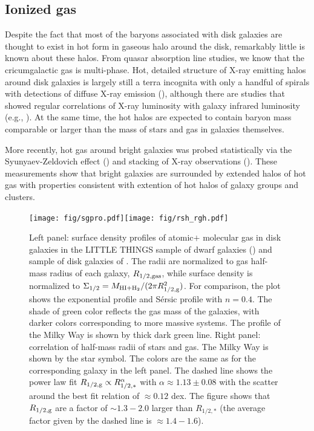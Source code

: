 \subsection{Ionized gas}
Despite the fact that most of the baryons associated with disk galaxies are thought to exist in hot form in gaseous halo around the disk, remarkably little is known about these halos. From quasar absorption line studies, we know that the cricumgalactic gas is multi-phase. Hot, detailed structure of X-ray emitting halos around disk galaxies is largely still a terra incognita with only a handful of spirals with detections of diffuse X-ray emission (\href{http://adsabs.harvard.edu/abs/2013ApJ...772...97B}{\citealt{bogdan_etal13}}), although there are studies that showed regular correlations of X-ray luminosity with galaxy infrared luminosity (e.g., \href{http://arxiv.org/abs/1011.1906}{\citealt{crain_etal10}}). At the same time, the hot halos are expected to contain baryon mass comparable or larger than the mass of stars and gas in galaxies themselves. 

More recently, hot gas around bright galaxies was probed statistically via the Syunyaev-Zeldovich effect (\href{http://adsabs.harvard.edu/abs/2013A%26A...557A..52P}{\citealt{ade_etal13}}) and stacking of X-ray observations (\href{http://adsabs.harvard.edu/abs/2015MNRAS.449.3806A}{\citealt{anderson_etal15}}). These measurements show that bright galaxies are surrounded by extended halos of hot gas with properties consistent with extention of hot halos of galaxy groups and clusters. 

\begin{figure}[t]
\centerline{
\texttt{[image: fig/sgpro.pdf]}\hspace{-2mm}\texttt{[image: fig/rsh\_rgh.pdf]}}
\vspace{-5mm}
\caption{Left panel: surface density profiles of atomic$+$ molecular gas in disk galaxies in the LITTLE THINGS sample of dwarf galaxies (\href{http://adsabs.harvard.edu/abs/2012AJ....143...47Z}{\citealt{zhang_etal12}}) and sample of disk galaxies of \href{http://adsabs.harvard.edu/abs/2008AJ....136.2782L}{\citet{leroy_etal08}}. The radii are normalized to gas half-mass radius of each galaxy, $R_{1/2,\rm gas}$, while
surface density is normalized to $\Sigma_{1/2}=M_{\rm HI+H_2}/(2\pi R_{1/2,\rm g}^2)$. For comparison, the plot shows the exponential profile and S\'ersic profile with $n=0.4$. The shade of green color reflects the gas mass of the galaxies, with darker colors corresponding to more massive systems. The profile of the Milky Way is shown by thick dark green line. Right panel: correlation of half-mass radii of stars and gas. The Milky Way is shown by the star symbol. The colors are the same as for the corresponding galaxy in the left panel. The dashed line shows the power law fit $R_{1/2,\rm g}\propto R_{1/2,*}^{\alpha}$ with $\alpha\approx 1.13\pm 0.08$ with the scatter around the best fit relation of $\approx 0.12$ dex. The figure shows that $R_{1/2,\rm g}$ are a factor of $\sim 1.3-2.0$ larger than $R_{1/2,*}$ (the average factor given by the dashed line is $\approx 1.4-1.6$). \label{fig:sgpro}}
\end{figure}

